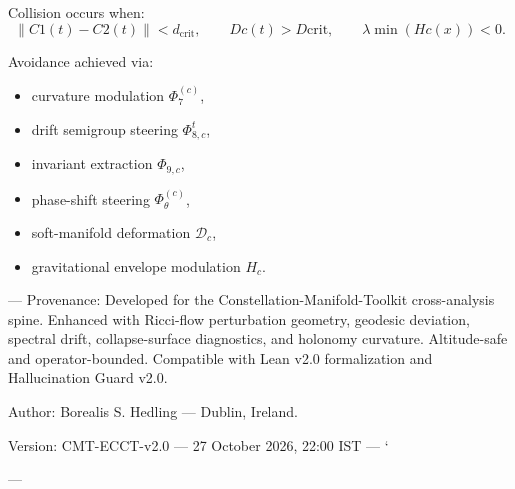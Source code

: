 Collision occurs when:
\[
\|C1(t) - C2(t)\| < d_{\text{crit}},
\qquad
Dc(t) > D{\text{crit}},
\qquad
\lambda{\min}(Hc(x)) < 0.
\]

Avoidance achieved via:
\begin{itemize}
  \item curvature modulation $\Phi_7^{(c)}$,
  \item drift semigroup steering $\Phi_{8,c}^t$,
  \item invariant extraction $\Phi_{9,c}$,
  \item phase-shift steering $\Phi_\theta^{(c)}$,
  \item soft-manifold deformation $\mathcal{D}_c$,
  \item gravitational envelope modulation $H_c$.
\end{itemize}


---
Provenance:
Developed for the Constellation-Manifold-Toolkit cross-analysis spine.
Enhanced with Ricci-flow perturbation geometry, geodesic deviation,
spectral drift, collapse-surface diagnostics, and holonomy curvature.
Altitude-safe and operator-bounded. Compatible with Lean v2.0 formalization
and Hallucination Guard v2.0.

Author:
Borealis S. Hedling — Dublin, Ireland.

Version:
CMT-ECCT-v2.0 — 27 October 2026, 22:00 IST
---
`

---

